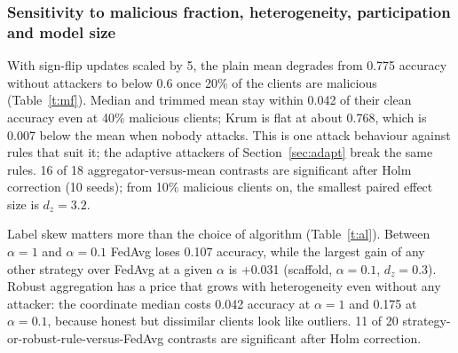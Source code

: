 \documentclass[conference]{IEEEtran}
\begin{document}
\subsubsection{Sensitivity to malicious fraction, heterogeneity, participation and model size}
With sign-flip updates scaled by 5, the plain mean degrades from 0.775 accuracy without attackers to below 0.6 once 20\% of the clients are malicious (Table~\ref{t:mf}). Median and trimmed mean stay within 0.042 of their clean accuracy even at 40\% malicious clients; Krum is flat at about 0.768, which is 0.007 below the mean when nobody attacks. This is one attack behaviour against rules that suit it; the adaptive attackers of Section~\ref{sec:adapt} break the same rules. 16 of 18 aggregator-versus-mean contrasts are significant after Holm correction (10 seeds); from 10\% malicious clients on, the smallest paired effect size is $d_z=3.2$.
\begin{table}[t]\centering\caption{Test accuracy (mean$\pm$95\% half-width over 10 seeds) under sign-flip updates scaled by 5, $K=20$.}\label{t:mf}\scriptsize
{}\end{table}
Label skew matters more than the choice of algorithm (Table~\ref{t:al}). Between $\alpha=1$ and $\alpha=0.1$ FedAvg loses 0.107 accuracy, while the largest gain of any other strategy over FedAvg at a given $\alpha$ is +0.031 (scaffold, $\alpha=0.1$, $d_z=0.3$). Robust aggregation has a price that grows with heterogeneity even without any attacker: the coordinate median costs 0.042 accuracy at $\alpha=1$ and 0.175 at $\alpha=0.1$, because honest but dissimilar clients look like outliers. 11 of 20 strategy-or-robust-rule-versus-FedAvg contrasts are significant after Holm correction.
\end{document}
